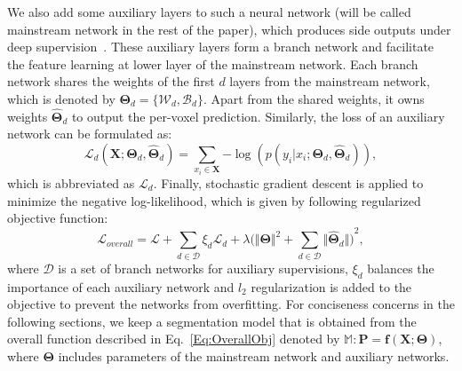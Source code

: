 \documentclass[10pt,twocolumn,letterpaper]{article}
\begin{document}
We also add some auxiliary layers to such a neural network (will be called mainstream network in the rest of the paper), which produces side outputs under deep supervision~\cite{lee2015deeply}. These auxiliary layers form a branch network and facilitate the feature learning at lower layer of the mainstream network. Each branch network shares the weights of the first $d$ layers from the mainstream network, which is denoted by $\boldsymbol{\Theta}_d = \{\mathcal{W}_d , \mathcal{B}_d\}$. Apart from the shared weights, it owns weights $\widehat{\boldsymbol{\Theta}}_d$ to output the per-voxel prediction. Similarly, the loss of an auxiliary network can be formulated as:
\begin{equation}\label{Eq:SoftmaxLoss}
\mathcal{L}_d(\mathbf{X}; \boldsymbol{\Theta}_d, \widehat{\boldsymbol{\Theta}}_d) = \sum_{x_i\in \mathbf{X}}{-\log(p(y_i | x_i; \boldsymbol{\Theta}_d, \widehat{\boldsymbol{\Theta}}_d))},
\end{equation}
which is abbreviated as $\mathcal{L}_d$. Finally, stochastic gradient descent is applied to minimize the negative log-likelihood, which is given by following regularized objective function:
\begin{equation}\label{Eq:OverallObj}
\mathcal{L}_{overall} = \mathcal{L} + \sum_{d\in \mathcal{D}}\xi_d\mathcal{L}_d + \lambda ({\Vert \boldsymbol{\Theta} \Vert}^2 + \sum_{d\in \mathcal{D}}{\Vert \widehat{\boldsymbol{\Theta}}_d \Vert)}^2,
\end{equation}
where $\mathcal{D}$ is a set of branch networks for auxiliary supervisions, $\xi_d$ balances the importance of each auxiliary network and $l_2$ regularization is added to the objective to prevent the networks from overfitting. For conciseness concerns in the following sections, we keep a segmentation model that is obtained from the overall function described in Eq.~\ref{Eq:OverallObj} denoted by $\mathbb{M}: \mathbf{P} = {\mathbf{f}\!\left(\mathbf{X}; \boldsymbol{\Theta}\right)}$, where $\boldsymbol{\Theta}$ includes parameters of the mainstream network and auxiliary networks.
\end{document}
